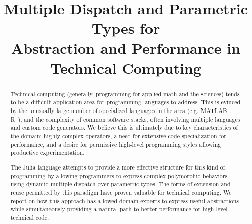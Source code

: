 \documentclass[10pt, preprint]{sigplanconf}
\begin{document}
\lstset{basicstyle=\footnotesize\ttfamily,mathescape=true,basewidth=0.5em}



\title{Multiple Dispatch and Parametric Types for \vspace{0.25em}\\
Abstraction and Performance in Technical Computing}
\authorinfo{}{}{}

\maketitle

\begin{abstract}
  Technical computing (generally, programming for applied math and the sciences) tends
  to be a difficult application area for programming languages to address. This is
  evinced by the unusually large number of specialized languages in the area
  (e.g. MATLAB~\cite{matlab}, R~\cite{rlang}), and the complexity of common
  software stacks, often involving multiple languages and custom code generators.
  We believe this is ultimately due to key characteristics of the domain:
  highly complex operators, a need for extensive code specialization for
  performance, and a desire for permissive high-level programming styles
  allowing productive experimentation.

  The Julia language attempts to provide a more effective structure
  for this kind of programming by allowing programmers to express complex
  polymorphic behaviors using dynamic multiple dispatch over
  parametric types. The forms of extension and reuse
  permitted by this paradigm have proven valuable for technical computing.
  We report on how this approach has allowed domain experts to express
  useful abstractions while simultaneously providing a natural path to better
  performance for high-level technical code.
\end{abstract}
\end{document}
